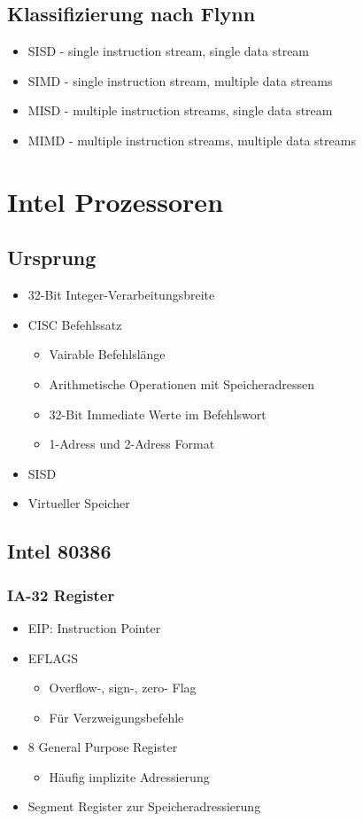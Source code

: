\subsection{Klassifizierung nach Flynn}
\begin{itemize}
\item SISD - single instruction stream, single data stream
\item SIMD - single instruction stream, multiple data streams
\item MISD - multiple instruction streams, single data stream
\item MIMD - multiple instruction streams, multiple data streams
\end{itemize}

\section{Intel Prozessoren}
\subsection{Ursprung}
\begin{itemize}
	\item 32-Bit Integer-Verarbeitungsbreite
	\item CISC Befehlssatz
	\begin{itemize}
		\item Vairable Befehlslänge
		\item Arithmetische Operationen mit Speicheradressen
		\item 32-Bit Immediate Werte im Befehlswort
		\item 1-Adress und 2-Adress Format
	\end{itemize}
	\item SISD
	\item Virtueller Speicher
\end{itemize}
\subsection{Intel 80386}
\subsubsection{IA-32 Register}
\begin{itemize}
		\item EIP: Instruction Pointer
		\item EFLAGS
		\begin{itemize}
			\item Overflow-, sign-, zero- Flag
			\item Für Verzweigungsbefehle
		\end{itemize}
		\item 8 General Purpose Register
		\begin{itemize}
			\item Häufig implizite Adressierung
		\end{itemize}
		\item Segment Register zur Speicheradressierung
\end{itemize}
